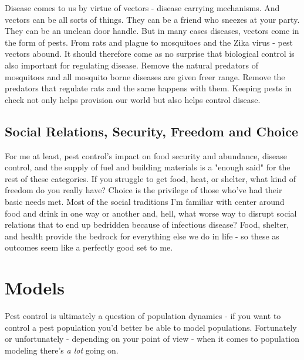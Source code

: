 \documentclass[11pt,a5paper]{book}
\begin{document}
Disease comes to us by virtue of vectors - disease carrying mechanisms. And vectors can be all sorts of things. They can be a friend who sneezes at your party. They can be an unclean door handle. But in many cases diseases, vectors come in the form of pests. From rats and plague to mosquitoes and the Zika virus - pest vectors abound. It should therefore come as no surprise that biological control is also important for regulating disease. Remove the natural predators of mosquitoes and all mosquito borne diseases are given freer range. Remove the predators that regulate rats and the same happens with them. Keeping pests in check not only helps provision our world but also helps control disease.

\subsection{Social Relations, Security, Freedom and Choice}
For me at least, pest control's impact on food security and abundance, disease control, and the supply of fuel and building materials is a "enough said" for the rest of these categories. If you struggle to get food, heat, or shelter, what kind of freedom do you really have?
Choice is the privilege of those who've had their basic needs met. Most of the social traditions I'm familiar with center around food and drink in one way or another and, hell, what worse way to disrupt social relations that to end up bedridden because of infectious disease? Food, shelter, and health provide the bedrock for everything else we do in life - so these as outcomes seem like a perfectly good set to me.

\section{Models}
Pest control is ultimately a question of population dynamics \cite{nmills} - if you want to control a pest population you'd better be able to model populations. Fortunately or unfortunately - depending on your point of view - when it comes to population modeling there's \textit{a lot} going on. 
\newline
\end{document}
